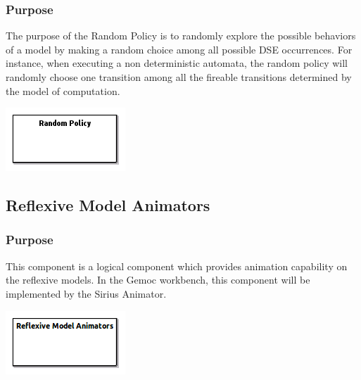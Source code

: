\documentclass{gemoc} %
\begin{document}
\subsubsection{Purpose}
The purpose of the Random Policy is to randomly explore the possible behaviors of a model by making a random choice among all possible DSE occurrences. For instance, when executing a non deterministic automata, the random policy will randomly choose one transition among all the fireable transitions determined by the model of computation.

\begin{center}
\includegraphics*[trim=0.0cm 0.0cm 0cm 0.0cm, clip=true]{../images/generated/Generated_Random_Policy.png}
\end{center}




\subsection{Reflexive Model Animators}


\subsubsection{Purpose}
This component is a logical component which provides animation capability on the reflexive models. In the Gemoc workbench, this component will be implemented by the Sirius Animator.

\begin{center}
\includegraphics*[trim=0.0cm 0.0cm 0cm 0.0cm, clip=true]{../images/generated/Generated_Reflexive_Model_Animators.png}
\end{center}
\end{document}
